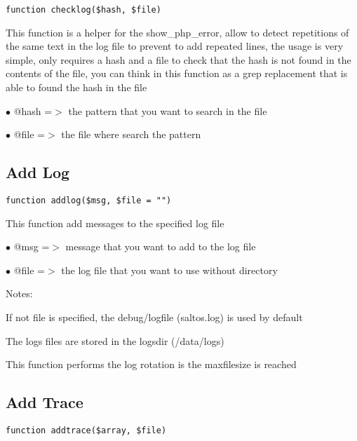 \documentclass[a4paper]{book}
\begin{document}
\begin{lstlisting}
function checklog($hash, $file)
\end{lstlisting}

This function is a helper for the show\_php\_error, allow to detect repetitions
of the same text in the log file to prevent to add repeated lines, the usage
is very simple, only requires a hash and a file to check that the hash is not
found in the contents of the file, you can think in this function as a grep
replacement that is able to found the hash in the file

\begin{compactitem}
\item[\color{myblue}$\bullet$] @hash =$>$ the pattern that you want to search in the file
\item[\color{myblue}$\bullet$] @file =$>$ the file where search the pattern
\end{compactitem}

\hypertarget{toc186}{}
\subsection{Add Log}

\begin{lstlisting}
function addlog($msg, $file = "")
\end{lstlisting}

This function add messages to the specified log file

\begin{compactitem}
\item[\color{myblue}$\bullet$] @msg  =$>$ message that you want to add to the log file
\item[\color{myblue}$\bullet$] @file =$>$ the log file that you want to use without directory
\end{compactitem}

Notes:

If not file is specified, the debug/logfile (saltos.log) is used by default

The logs files are stored in the logsdir (/data/logs)

This function performs the log rotation is the maxfilesize is reached

\hypertarget{toc187}{}
\subsection{Add Trace}

\begin{lstlisting}
function addtrace($array, $file)
\end{lstlisting}
\end{document}
